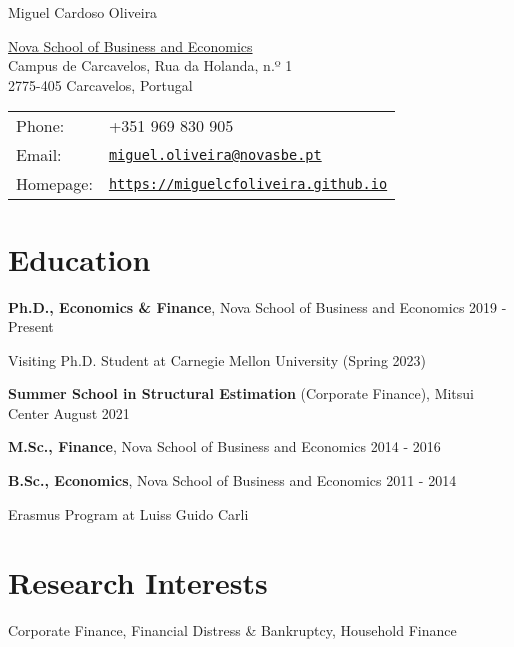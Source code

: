 \documentclass[letterpaper]{article}
\def\name{Miguel Cardoso Oliveira}
\newenvironment{itemize*}{
  \begin{list}{}{
    \setlength{\leftmargin}{1.5em}
  }
}{
  \end{list}
}
\begin{document}
{\huge \name}

\vspace{0.3in}

\begin{minipage}{0.45\linewidth}
  \href{https://www.novasbe.unl.pt/en/}{Nova School of Business and Economics} \\
  Campus de Carcavelos, Rua da Holanda, n.º 1 \\ 
  2775-405 Carcavelos, Portugal 
\end{minipage}
\begin{minipage}{0.45\linewidth}
  \begin{tabular}{ll}
    Phone: & +351 969 830 905 \\
    Email: & \href{mailto:miguel.oliveira@novasbe.pt}{\tt miguel.oliveira@novasbe.pt} \\
    Homepage: & \href{https://miguelcfoliveira.github.io}{\tt https://miguelcfoliveira.github.io} 
  \end{tabular}
\end{minipage}

\section*{Education}
\begin{itemize*}
\item \textbf{Ph.D., Economics \& Finance}, Nova School of Business and Economics \hfill 2019 - Present
\item \phantom{aaa} Visiting Ph.D. Student at Carnegie Mellon University (Spring 2023)
\item \textbf{Summer School in Structural Estimation} (Corporate Finance), Mitsui Center \hfill August 2021
\item \textbf{M.Sc., Finance}, Nova School of Business and Economics \hfill 2014 - 2016
\item \textbf{B.Sc., Economics}, Nova School of Business and Economics \hfill  2011 - 2014
\item \phantom{aaa} Erasmus Program at Luiss Guido Carli
\end{itemize*}

\section*{Research Interests}
\begin{itemize*}
\item Corporate Finance, Financial Distress \& Bankruptcy, Household Finance
\end{itemize*}
\end{document}
